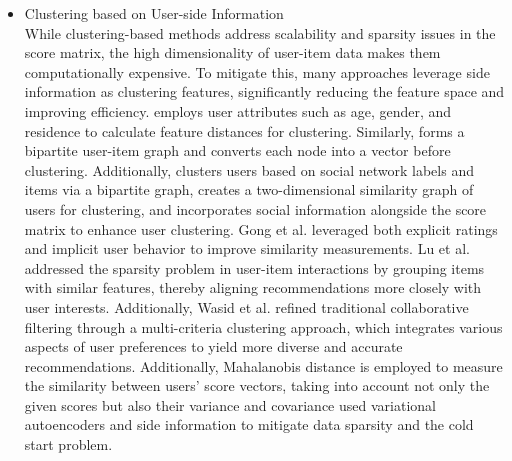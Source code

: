 \documentclass{article}
\begin{document}
\begin{itemize}
\item[b) ] Clustering based on User-side Information \\ 
While clustering-based methods address scalability and sparsity issues in the score matrix, the high dimensionality of user-item data makes them computationally expensive. To mitigate this, many approaches leverage side information as clustering features, significantly reducing the feature space and improving efficiency. \cite{liji2018improved} employs user attributes such as age, gender, and residence to calculate feature distances for clustering. Similarly, \cite{chen2019n2vscdnnr} forms a bipartite user-item graph and converts each node into a vector before clustering. Additionally, \cite{zhao2017coarse} clusters users based on social network labels and items via a bipartite graph, \cite{sheugh2018novel} creates a two-dimensional similarity graph of users for clustering, and \cite{wasid2018clustering} incorporates social information alongside the score matrix to enhance user clustering. Gong et al. \cite{gong2010collaborative} leveraged both explicit ratings and implicit user behavior to improve similarity measurements. Lu et al. \cite{lu2021novel} addressed the sparsity problem in user-item interactions by grouping items with similar features, thereby aligning recommendations more closely with user interests. Additionally, Wasid et al. \cite{wasid2018improved} refined traditional collaborative filtering through a multi-criteria clustering approach, which integrates various aspects of user preferences to yield more diverse and accurate recommendations. Additionally, Mahalanobis distance is employed to measure the similarity between users' score vectors, taking into account not only the given scores but also their variance and covariance \cite{deng2019neural} used variational autoencoders and side information to mitigate data sparsity and the cold start problem. 


\end{itemize}
\end{document}

